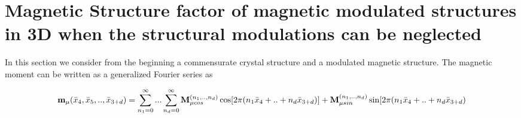 \documentclass[10pt]{article}
\begin{document}






 
\section{Magnetic Structure factor of magnetic modulated structures in 3D when the structural modulations can be neglected}

In this section we consider from the beginning a commensurate crystal structure and a modulated magnetic structure. The magnetic moment can be written as a generalized Fourier series as 

\begin{equation} \label{mmod_funct1}
{\bf m}_\mu(\bar{x}_4,\bar{x}_5,..,\bar{x}_{3+d}) =\sum\limits_{n_1=0}^{\infty} ... \sum\limits_{n_d=0}^{\infty} {\bf M}_{\mu cos}^{(n_1,..,n_d)} \cos[2\pi(n_1\bar{x}_4+..+ n_d\bar{x}_{3+d})] + {\bf M}_{\mu sin}^{(n_1,..,n_d)} \sin[2\pi(n_1\bar{x}_4+..+ n_d\bar{x}_{3+d})
\end{equation}
\end{document}
